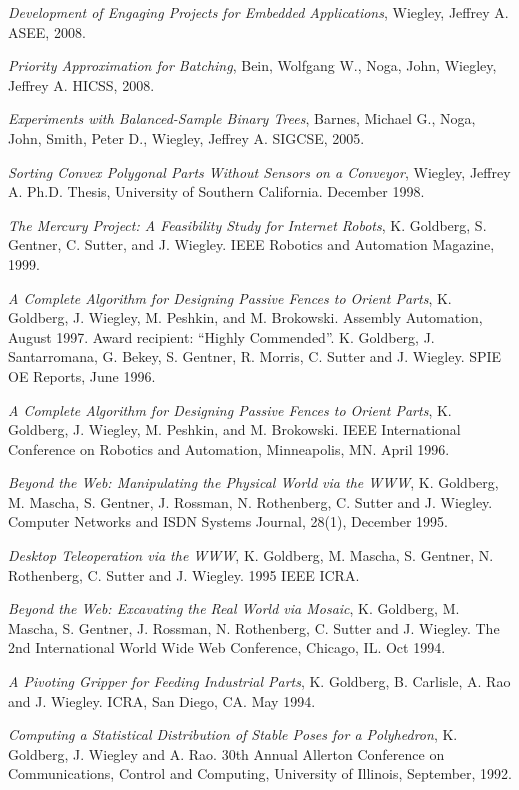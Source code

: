 \documentclass[12pt]{report}
\begin{document}
\emph{Development of Engaging Projects for Embedded Applications},
  Wiegley, Jeffrey A. ASEE, 2008.

\emph{Priority Approximation for Batching},
	Bein, Wolfgang W., Noga, John, Wiegley, Jeffrey A. HICSS, 2008.

\emph{Experiments with Balanced-Sample Binary Trees},
  Barnes, Michael G., Noga, John, Smith, Peter D., Wiegley,
  Jeffrey A. SIGCSE, 2005.

\emph{Sorting Convex Polygonal Parts Without Sensors on a Conveyor},
	Wiegley, Jeffrey A.  Ph.D. Thesis, University of Southern California. December 1998.

\emph{The Mercury Project: A Feasibility Study for Internet Robots},
  K. Goldberg, S. Gentner, C. Sutter, and J. Wiegley. IEEE Robotics and Automation Magazine, 1999.

\emph{A Complete Algorithm for Designing Passive Fences
  to Orient Parts}, K. Goldberg, J. Wiegley, M. Peshkin, and
  M. Brokowski.  Assembly Automation, August 1997.  Award recipient:
  ``Highly Commended''.
  K. Goldberg, J. Santarromana, G. Bekey, S. Gentner, R. Morris,
  C. Sutter and J. Wiegley. SPIE OE Reports, June 1996.

\emph{A Complete Algorithm for Designing Passive Fences
  to Orient Parts}, K. Goldberg, J. Wiegley, M. Peshkin, and
  M. Brokowski.  IEEE International Conference on Robotics and
  Automation, Minneapolis, MN. April 1996.

\emph{Beyond the Web: Manipulating the Physical World
  via the WWW}, K. Goldberg, M. Mascha, S. Gentner, J. Rossman,
  N. Rothenberg, C. Sutter and J. Wiegley.  Computer Networks and ISDN
  Systems Journal, 28(1), December 1995.

\emph{Desktop Teleoperation via the WWW},  K. Goldberg,
  M. Mascha, S. Gentner, N. Rothenberg, C. Sutter and J. Wiegley.
  1995 IEEE ICRA. 

\emph{Beyond the Web: Excavating the Real World via
  Mosaic},  K. Goldberg, M. Mascha, S. Gentner, J. Rossman,
  N. Rothenberg, C. Sutter and J. Wiegley.  The 2nd International
  World Wide Web Conference, Chicago, IL. Oct 1994.

\emph{A Pivoting Gripper for Feeding Industrial Parts},
  K. Goldberg, B. Carlisle, A. Rao and J. Wiegley.  ICRA, San Diego,
  CA. May 1994.

\emph{Computing a Statistical Distribution of Stable
  Poses for a Polyhedron}, K. Goldberg, J. Wiegley and A. Rao.  30th
  Annual Allerton Conference on Communications, Control and Computing,
  University of Illinois, September, 1992.
\end{document}
